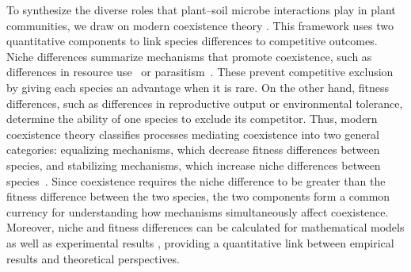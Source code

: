 To synthesize the diverse roles that plant--soil microbe interactions play in plant communities, we draw on modern coexistence theory \citep{Chesson1990, Chesson2000, Chesson2008}. This framework uses two quantitative components to link species differences to competitive outcomes.
Niche differences summarize mechanisms that promote coexistence, such as differences in resource use~\citep{Chesson1990} or parasitism~\citep{Chesson2008}. These prevent competitive exclusion by giving each species an advantage when it is rare. On the other hand, fitness differences, such as differences in reproductive output or environmental tolerance, determine the ability of one species to exclude its competitor.
Thus, modern coexistence theory classifies processes mediating coexistence into two general categories: equalizing mechanisms, which decrease fitness differences between species, and stabilizing mechanisms, which increase niche differences between species~\citep{Chesson2000, Adler2007, Hillerislambers2012}.
Since coexistence requires the niche difference to be greater than the fitness difference between the two species, the two components form a common currency for understanding how mechanisms simultaneously affect coexistence.
Moreover, niche and fitness differences can be calculated for mathematical models \citep{Chesson2008} as well as experimental results \citep{Godoy2014, Gross2015, Kraft2015}, providing a quantitative link between empirical results and theoretical perspectives.
\par


